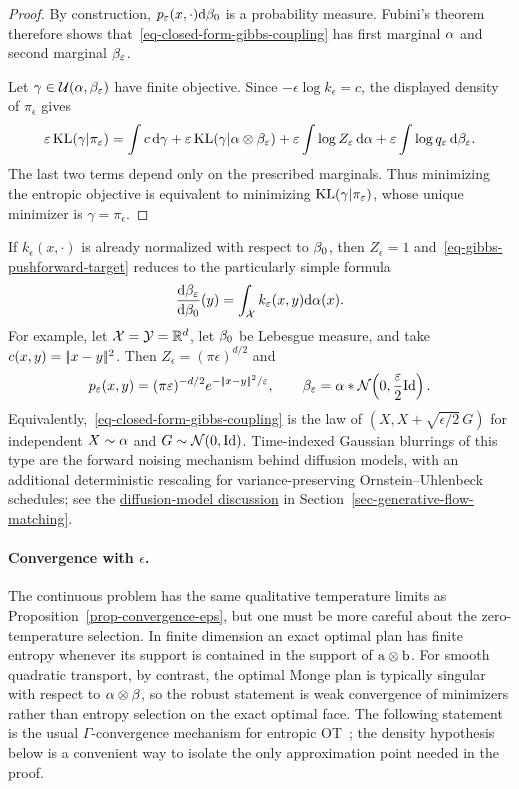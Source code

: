 \begin{proof}
By construction, $p_\varepsilon(x,\cdot)\mathrm{d}\beta_0$ is a probability measure. Fubini's theorem therefore shows that~\eqref{eq-closed-form-gibbs-coupling} has first marginal $\alpha$ and second marginal $\beta_\varepsilon$.

Let $\gamma\in\mathcal{U}(\alpha,\beta_\varepsilon)$ have finite objective. Since $-\epsilon\log k_\epsilon=c$, the displayed density of $\pi_\epsilon$ gives
\[
	\varepsilon\operatorname{KL}(\gamma|\pi_\varepsilon)
	=
	\int c\,\mathrm{d}\gamma
	+\varepsilon\operatorname{KL}(\gamma|\alpha\otimes\beta_\varepsilon)
	+\varepsilon\int\log Z_\varepsilon\,\mathrm{d}\alpha
	+\varepsilon\int\log q_\varepsilon\,\mathrm{d}\beta_\varepsilon.
\]
The last two terms depend only on the prescribed marginals. Thus minimizing the entropic objective is equivalent to minimizing $\operatorname{KL}(\gamma|\pi_\varepsilon)$, whose unique minimizer is $\gamma=\pi_\epsilon$.
\end{proof}

If $k_\epsilon(x,\cdot)$ is already normalized with respect to $\beta_0$, then $Z_\epsilon=1$ and~\eqref{eq-gibbs-pushforward-target} reduces to the particularly simple formula
\[
	\frac{\mathrm{d}\beta_\varepsilon}{\mathrm{d}\beta_0}(y)
	=
	\int_{\mathcal{X}} k_\varepsilon(x,y)\mathrm{d}\alpha(x).
\]
For example, let $\mathcal{X}=\mathcal{Y}=\mathbb{R}^d$, let $\beta_0$ be Lebesgue measure, and take $c(x,y)=|\!| x-y |\!|^2$. Then $Z_\epsilon=(\pi\epsilon)^{d/2}$ and
\[
	p_\varepsilon(x,y)
	=
	(\pi\varepsilon)^{-d/2}e^{-|\!| x-y |\!|^2/\varepsilon},
	\qquad
	\beta_\varepsilon
	=
	\alpha*\mathcal{N}\!\left(0,\frac{\varepsilon}{2}\mathrm{Id}\right).
\]
Equivalently,~\eqref{eq-closed-form-gibbs-coupling} is the law of
\(
	(X,X+\sqrt{\epsilon/2}\,G)
\)
for independent $X\sim\alpha$ and $G\sim\mathcal{N}(0,\mathrm{Id})$. Time-indexed Gaussian blurrings of this type are the forward noising mechanism behind diffusion models, with an additional deterministic rescaling for variance-preserving Ornstein--Uhlenbeck schedules; see the \hyperref[par-diffusion-model-connection]{diffusion-model discussion} in Section~\ref{sec-generative-flow-matching}.

\paragraph{Convergence with \texorpdfstring{$\epsilon$}{epsilon}.}

The continuous problem has the same qualitative temperature limits as Proposition~\ref{prop-convergence-eps}, but one must be more careful about the zero-temperature selection. In finite dimension an exact optimal plan has finite entropy whenever its support is contained in the support of $\mathrm{a}\otimes\mathrm{b}$. For smooth quadratic transport, by contrast, the optimal Monge plan is typically singular with respect to $\alpha\otimes\beta$, so the robust statement is weak convergence of minimizers rather than entropy selection on the exact optimal face. The following statement is the usual $\Gamma$-convergence mechanism for entropic OT~\cite{leonard2012schrodinger,2017-carlier-SIMA}; the density hypothesis below is a convenient way to isolate the only approximation point needed in the proof.

